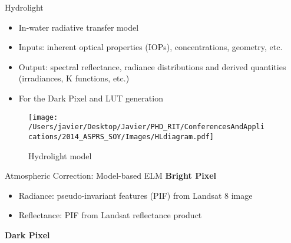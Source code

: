 \documentclass[mathserif]{beamer}
\begin{document}
\begin{frame}{}
\begin{columns}[t]
\begin{column}{.3\linewidth}
\end{column}   

 \begin{column}{.3\linewidth}  %

\begin{block}{Hydrolight}
\small
\begin{itemize}
  \item In-water radiative transfer model
  \vspace{0.5cm}
  \item Inputs: inherent optical properties (IOPs), concentrations, geometry, etc.
  \vspace{0.5cm}
  \item Output: spectral reflectance, radiance distributions and derived quantities (irradiances, K functions, etc.)
  \vspace{0.5cm}
  \item For the Dark Pixel and LUT generation
\end{itemize}
\vspace{1cm}
\begin{figure}[H]
    \texttt{[image: /Users/javier/Desktop/Javier/PHD\_RIT/ConferencesAndApplications/2014\_ASPRS\_SOY/Images/HLdiagram.pdf]}
    \caption{Hydrolight model}
\end{figure}
\end{block}


\begin{block}{Atmospheric Correction: Model-based ELM}
{\large \bf Bright Pixel}
\begin{itemize}
    \item Radiance: pseudo-invariant features (PIF) from Landsat 8 image
    \vspace{0.5cm}
    \item Reflectance: PIF from Landsat reflectance product
\end{itemize}
\vspace{0.3cm}
{\large \bf Dark Pixel}


\end{block}
\end{column}
\end{columns}
\end{frame}
\end{document}

